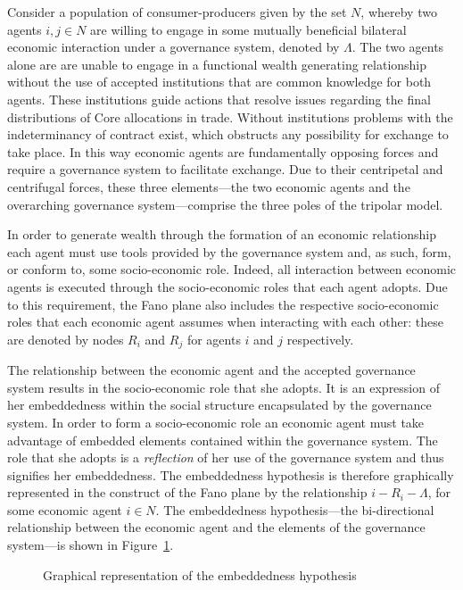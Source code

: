 Consider a population of consumer-producers given by the set $N$, whereby two agents $i,j \in N$ are willing to engage in some mutually beneficial bilateral economic interaction under a governance system, denoted by $\Lambda$. The two agents alone are are unable to engage in a functional wealth generating relationship without the use of accepted institutions that are common knowledge for both agents. These institutions guide actions that resolve issues regarding the final distributions of Core allocations in trade. Without institutions problems with the indeterminancy of contract exist, which obstructs any possibility for exchange to take place. In this way economic agents are fundamentally opposing forces and require a governance system to facilitate exchange. Due to their centripetal and centrifugal forces, these three elements---the two economic agents and the overarching governance system---comprise the three poles of the tripolar model. 

In order to generate wealth through the formation of an economic relationship each agent must use tools provided by the governance system and, as such, form, or conform to, some socio-economic role. Indeed, all interaction between economic agents is executed through the socio-economic roles that each agent adopts. Due to this requirement, the Fano plane also includes the respective socio-economic roles that each economic agent assumes when interacting with each other: these are denoted by nodes $R_{i}$ and $R_{j}$ for agents $i$ and $j$ respectively.

The relationship between the economic agent and the accepted governance system results in the socio-economic role that she adopts. It is an expression of her embeddedness within the social structure encapsulated by the governance system. In order to form a socio-economic role an economic agent must take advantage of embedded elements contained within the governance system. The role that she adopts is a \emph{reflection} of her use of the governance system and thus signifies her embeddedness. The embeddedness hypothesis is therefore graphically represented in the construct of the Fano plane by the relationship $i-R_{i}-\Lambda$, for some economic agent $i \in N$. The embeddedness hypothesis---the bi-directional relationship between the economic agent and the elements of the governance system---is shown in Figure~\ref{fig:embeddednessHypothesis}.

\begin{figure}[h]
\begin{center}
\end{center}
\caption[Graphical representation of the embeddedness hypothesis]{Graphical representation of the embeddedness hypothesis}
\label{fig:embeddednessHypothesis}
\end{figure}

